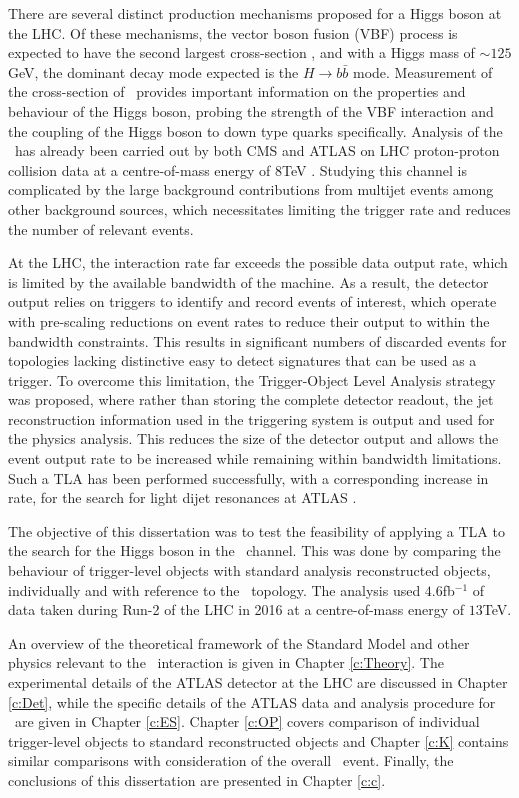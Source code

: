 There are several distinct production mechanisms proposed for a Higgs boson at the LHC. Of these mechanisms, the vector boson fusion (VBF) process is expected to have the second largest cross-section \cite{LHCHiggsCS}, and with a Higgs mass of $\sim125$GeV, the dominant decay mode expected \cite{HDECAY} is the $H\rightarrow b\bar{b}$ mode. Measurement of the cross-section of \VBFHBB\ provides important information on the properties and behaviour of the Higgs boson, probing the strength of the VBF interaction and the coupling of the Higgs boson to down type quarks specifically. Analysis of the \VBFHBB\ has already been carried out by both CMS \cite{cmsvbfhbb} and ATLAS \cite{VBFHbb8tev} on LHC proton-proton collision data at a centre-of-mass energy of $8$TeV
. Studying this channel is complicated by the large background contributions from multijet events among other background sources, which necessitates limiting the trigger rate and reduces the number of relevant events.

At the LHC, the interaction rate far exceeds the possible data output rate, which is limited by the available bandwidth of the machine. As a result, the detector output relies on triggers to identify and record events of interest, which operate with pre-scaling reductions on event rates to reduce their output to within the bandwidth constraints. This results in significant numbers of discarded events for topologies lacking distinctive easy to detect signatures that can be used as a trigger. To overcome this limitation, the Trigger-Object Level Analysis strategy was proposed, where rather than storing the complete detector readout, the jet reconstruction information used in the triggering system is output and used for the physics analysis. This reduces the size of the detector output and allows the event output rate to be increased while remaining within bandwidth limitations. Such a TLA has been performed successfully, with a corresponding increase in rate, for the search for light dijet resonances at ATLAS \cite{tla}.

The objective of this dissertation was to test the feasibility of applying a TLA to the search for the Higgs boson in the \VBFHBB\ channel. This was done by comparing the behaviour of trigger-level objects with standard analysis reconstructed objects, individually and with reference to the \VBFHBB\ topology. The analysis used $4.6$fb$^{-1}$ of data taken during Run-2 of the LHC in 2016 at a centre-of-mass energy of $13$TeV.

An overview of the theoretical framework of the Standard Model and other physics relevant to the \VBFHBB\ interaction is given in Chapter \ref{c:Theory}. The experimental details of the ATLAS detector at the LHC are discussed in Chapter \ref{c:Det}, while the specific details of the ATLAS data and analysis procedure for \VBFHBB\ are given in Chapter \ref{c:ES}. Chapter \ref{c:OP} covers comparison of individual trigger-level objects to standard reconstructed objects and Chapter \ref{c:K} contains similar comparisons with consideration of the overall \VBFHBB\ event. Finally, the conclusions of this dissertation are presented in Chapter \ref{c:c}.


